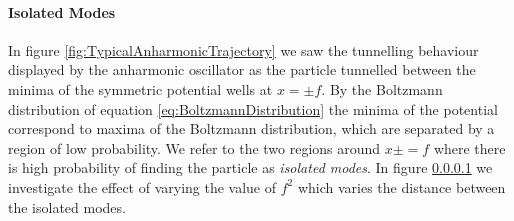 \documentclass[12pt]{article}
\begin{document}
            \paragraph{Isolated Modes}
                In figure \ref{fig:TypicalAnharmonicTrajectory} we saw the tunnelling behaviour displayed by the anharmonic oscillator as the particle tunnelled between the minima of the symmetric potential wells at $x=\pm f$. By the Boltzmann distribution of equation \ref{eq:BoltzmannDistribution} the minima of the potential correspond to maxima of the Boltzmann distribution, which are separated by a region of low probability. We refer to the two regions around $x\pm=f$ where there is high probability of finding the particle as \textit{isolated modes}. In figure \ref{} we investigate the effect of varying the value of $f^2$ which varies the distance between the isolated modes.
\end{document}
